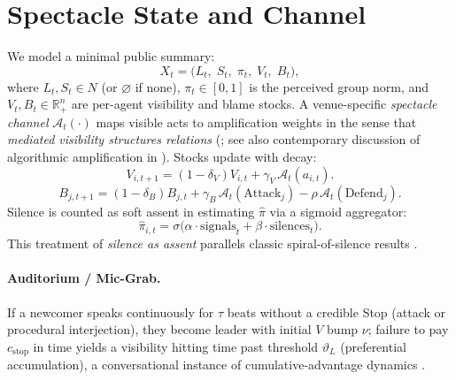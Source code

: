 \documentclass[11pt]{article}
\theoremstyle{definition}
\newcommand{\Spectacle}{\mathcal{A}}
\newcommand{\State}{X_t}
\newcommand{\Leader}{L_t}
\newcommand{\Scapegoat}{S_t}
\newcommand{\V}{V}
\newcommand{\B}{B}
\newcommand{\normp}{\pi}
\newcommand{\hatpi}{\hat{\pi}}
\begin{document}
\section{Spectacle State and Channel}
We model a minimal public summary:
\begin{equation*}
  \State = \big(\Leader,\; \Scapegoat,\; \normp_t,\; \V_t,\; \B_t\big),
\end{equation*}
where $\Leader,\Scapegoat\in N$ (or $\varnothing$ if none), $\normp_t\in[0,1]$ is the perceived group norm, and $\V_t,\B_t\in\mathbb{R}_+^n$ are per\hyp agent visibility and blame stocks. A venue\hyp specific \emph{spectacle channel} $\Spectacle_t(\cdot)$ maps visible acts to amplification weights in the sense that \emph{mediated visibility structures relations} (\citealp{debord1967}; see also contemporary discussion of algorithmic amplification in \citealp{burton2023algorithmic}). Stocks update with decay:
\begin{equation}
  V_{i,t+1}=(1-\delta_V)V_{i,t}+\gamma_V\,\Spectacle_t(a_{i,t}).
\end{equation}
\begin{equation}
  B_{j,t+1}=(1-\delta_B)B_{j,t}+\gamma_B\,\Spectacle_t(\mathrm{Attack}_j)-\rho\,\Spectacle_t(\mathrm{Defend}_j).
\end{equation}
Silence is counted as soft assent in estimating $\hatpi$ via a sigmoid aggregator:
\begin{equation}
  \hatpi_{i,t} = \sigma\!\big(\alpha\cdot \text{signals}_t + \beta\cdot \text{silences}_t\big).
\end{equation}
This treatment of \emph{silence as assent} parallels classic spiral\hyp of\hyp silence results \citep{noelleneumann1974}.

\paragraph{Auditorium / Mic\hyp Grab.}
If a newcomer speaks continuously for $\tau$ beats without a credible Stop (attack or procedural interjection), they become leader with initial $V$ bump $\nu$; failure to pay $c_{\text{stop}}$ in time yields a visibility hitting time past threshold $\vartheta_L$ (preferential accumulation), a conversational instance of cumulative\hyp advantage dynamics \citep{salganik2006}.

\end{document}
